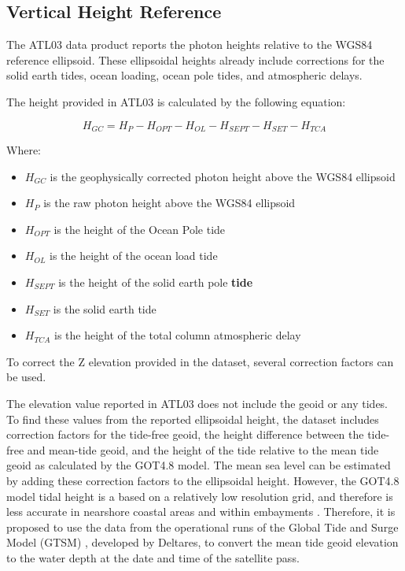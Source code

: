\subsection{Vertical Height Reference}

The ATL03 data product reports the photon heights relative to the WGS84 reference ellipsoid. These ellipsoidal heights already include corrections for the solid earth tides, ocean loading, ocean pole tides, and atmospheric delays.

The height provided in ATL03 is calculated by the following equation:

\[H_{GC} =  H_{P} - H_{OPT} - H_{OL} - H_{SEPT} - H_{SET} - H_{TCA}\]

Where:

\begin{itemize}

      \item \(H_{GC}\) is the geophysically corrected photon height above the WGS84 ellipsoid
      \item \(H_{P}\) is the raw photon height above the WGS84 ellipsoid
      \item \(H_{OPT}\) is the height of the Ocean Pole tide
      \item \(H_{OL}\) is the height of the ocean load tide
      \item \(H_{SEPT}\) is the height of the solid earth pole \textbf{tide}
      \item \(H_{SET}\) is the solid earth tide
      \item \(H_{TCA}\) is the height of the total column atmospheric delay
\end{itemize}

To correct the Z elevation provided in the dataset, several correction factors can be used. 

The elevation value reported in ATL03 does not include the geoid or any tides. To find these values from the reported ellipsoidal height, the dataset includes correction factors for the tide-free geoid, the height difference between the tide-free and mean-tide geoid, and the height of the tide relative to the mean tide geoid as calculated by the GOT4.8 model. The mean sea level can be estimated by adding these correction factors to the ellipsoidal height. However, the GOT4.8 model tidal height is a based on a relatively low resolution grid, and therefore is less accurate in nearshore coastal areas and within embayments \parencite{Neumann2019e}. Therefore, it is proposed to use the data from the operational runs of the Global Tide and Surge Model (GTSM) \parencite{Buckman2015}, developed by Deltares, to convert the mean tide geoid elevation to the water depth at the date and time of the satellite pass.

